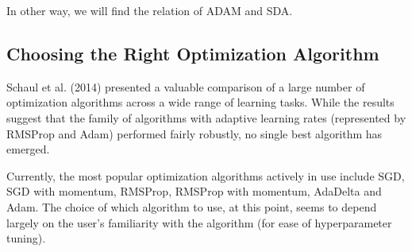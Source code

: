In other way, we will find the relation of ADAM and SDA.

\subsection{Choosing the Right Optimization Algorithm}
Schaul et al. (2014) presented a valuable comparison of a large number of optimization algorithms across a wide range of learning tasks. While the results suggest that the family of algorithms with adaptive learning rates (represented by RMSProp and Adam) performed fairly robustly, no single best algorithm has emerged.

Currently, the most popular optimization algorithms actively in use include SGD, SGD with momentum, RMSProp, RMSProp with momentum, AdaDelta and Adam. The choice of which algorithm to use, at this point, seems to depend largely on the user's familiarity with the algorithm (for ease of hyperparameter tuning).

